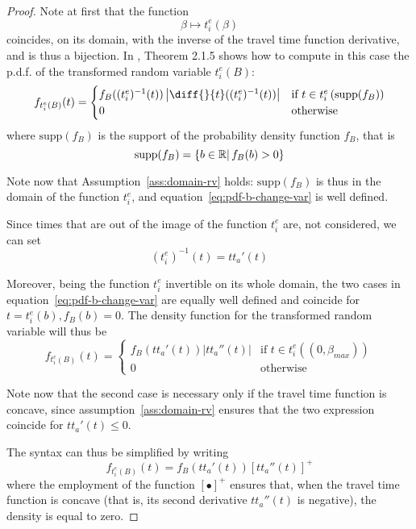 \begin{proof}
  Note at first that the function
  \begin{equation*}
    \beta \mapsto t_i^e(\beta)
  \end{equation*}
  coincides, on its domain,
with the inverse of the travel time function derivative, and is thus a bijection.
In \citet{casella2001statistical}, Theorem 2.1.5 shows how to compute in this case the p.d.f. of the transformed random variable \(t_i^e(B)\):
\begin{equation}
  \label{eq:pdf-b-change-var}
  f_{t_i^e(B)}(t) =
  \begin{cases}
    f_B((t_i^e)^{-1}(t)) \left| \diff{}{t}((t_i^e)^{-1}(t)) \right| & \text{if } t \in t_i^e\left(\text{supp}(f_B)\right) \\
    0 & \text{otherwise}
  \end{cases}
\end{equation}
where \(\text{supp}(f_B)\) is the support of the probability density function \(f_B\), that is
\begin{equation*}
  \text{supp}(f_B) = \{b \in \mathbb{R} |\, f_B(b) > 0 \}
\end{equation*}

Note now that Assumption~\ref{ass:domain-rv} holds:
\(\text{supp}(f_B)\) is thus in the domain of the function \(t_i^e\),
and equation~\eqref{eq:pdf-b-change-var} is well defined.

Since times that are out of the image of the function \(t_i^e\) are,
not considered,
we can set
\begin{equation*}
  (t_i^e)^{-1}(t) = tt_a'(t)
\end{equation*}

Moreover, being the function \(t_i^e\) invertible on its whole domain,
the two cases in equation~\eqref{eq:pdf-b-change-var} are equally well defined and coincide for \(t = t_i^e(b), f_B(b) = 0\).
The density function for the transformed random variable will thus be
\begin{equation*}
  f_{t_i^e(B)}(t) =
  \begin{cases}
    f_B(tt_a'(t)) \left|tt_a''(t)\right| & \text{if } t \in t_i^e\left((0, \beta_{max})\right) \\
    0 & \text{otherwise}
  \end{cases}
\end{equation*}

Note now that the second case is necessary only if the travel time function is concave,
since assumption~\ref{ass:domain-rv} ensures that the two expression coincide for \(tt_a'(t) \leq 0\).

The syntax can thus be simplified by writing
\begin{equation*}
  f_{t_i^e(B)}(t) = f_B(tt_a'(t)) [tt_a''(t)]^+
\end{equation*}
where the employment of the function \([\bullet]^+\) ensures that,
when the travel time function is concave (that is, its second derivative \(tt_a''(t)\) is negative),
the density is equal to zero.
\end{proof}

